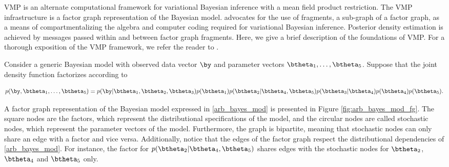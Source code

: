 \documentclass[12pt]{article}
\theoremstyle{plain}
\theoremstyle{definition}
\theoremstyle{remark}
\begin{document}
VMP is an alternate computational framework for variational Bayesian inference with a mean field product restriction.
The VMP infrastructure is a factor graph representation of the Bayesian model.  advocates for
the use of fragments, a sub-graph of a factor graph, as a means of compartmentalizing the algebra and computer
coding required for variational Bayesian inference. Posterior density estimation is achieved by messages passed
within and between factor graph fragments. Here, we give a brief description of the foundations of VMP. For a
thorough exposition of the VMP framework, we refer the reader to .

Consider a generic Bayesian model with observed data vector $\by$ and parameter vectors $\btheta_1, \dots,
\btheta_5$. Suppose that the joint density function factorizes according to

\begin{equation}
	p (\by, \btheta_1, \dots, \btheta_5) =
		p (\by | \btheta_1, \btheta_2, \btheta_3) p (\btheta_1) p (\btheta_2 | \btheta_4, \btheta_5)
		p (\btheta_3 | \btheta_4) p (\btheta_4) p (\btheta_5).
\label{arb_bayes_mod}
\end{equation}

\noindent A factor graph representation of the Bayesian model expressed in \eqref{arb_bayes_mod} is presented
in Figure \ref{fig:arb_bayes_mod_fg}. The square nodes are the factors, which represent the distributional
specifications of the model, and the circular nodes are called stochastic nodes, which represent the parameter
vectors of the model. Furthermore, the graph is bipartite, meaning that stochastic nodes can only share an
edge with a factor and vice versa. Additionally, notice that the edges of the factor graph respect the distributional
dependencies of \eqref{arb_bayes_mod}. For instance, the factor for $p (\btheta_2 | \btheta_4, \btheta_5)$
shares edges with the stochastic nodes for $\btheta_2$, $\btheta_4$ and $\btheta_5$ only.
\end{document}
